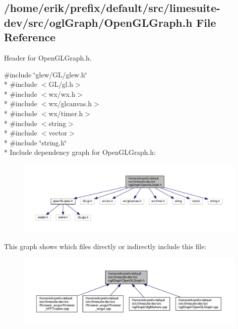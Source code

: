 \subsection{/home/erik/prefix/default/src/limesuite-\/dev/src/ogl\+Graph/\+Open\+G\+L\+Graph.h File Reference}
\label{OpenGLGraph_8h}


Header for Open\+G\+L\+Graph.\+h.  


{\ttfamily \#include \char`\"{}glew/\+G\+L/glew.\+h\char`\"{}}\\*
{\ttfamily \#include $<$G\+L/gl.\+h$>$}\\*
{\ttfamily \#include $<$wx/wx.\+h$>$}\\*
{\ttfamily \#include $<$wx/glcanvas.\+h$>$}\\*
{\ttfamily \#include $<$wx/timer.\+h$>$}\\*
{\ttfamily \#include $<$string$>$}\\*
{\ttfamily \#include $<$vector$>$}\\*
{\ttfamily \#include \char`\"{}string.\+h\char`\"{}}\\*
Include dependency graph for Open\+G\+L\+Graph.\+h\+:
\nopagebreak
\begin{figure}[H]
\begin{center}
\leavevmode
\includegraphics[width=350pt]{d2/df3/OpenGLGraph_8h__incl}
\end{center}
\end{figure}
This graph shows which files directly or indirectly include this file\+:
\nopagebreak
\begin{figure}[H]
\begin{center}
\leavevmode
\includegraphics[width=350pt]{da/d7e/OpenGLGraph_8h__dep__incl}
\end{center}
\end{figure}
